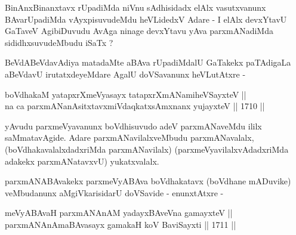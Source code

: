 \begin{artha}
BinAnxBinanxtavx rUpadiMda niVnu sAdhisidadx elAlx vasutxvanunx
BAvarUpadiMda vAyxpisuvudeMdu heVLidedxV Adare - I elAlx devxYtavU
GaTaveV AgibiDuvudu AvAga ninage  devxYtavu yAva parxmANadiMda
sididhxsuvudeMbudu iSaTx ?
\end{artha}

\begin{artha}
BeVdABeVdavAdiya matadaMte aBAva rUpadiMdalU GaTakekx paTAdigaLa
aBeVdavU irutatxdeyeMdare AgalU doVSavanunx heVLutAtxre - 
\end{artha}

\begin{shl}
\footnotemark[1]boVdhakaM yatapxrXmeVyasayx tatapxrXmANamiheVSayxteV || \\
na ca parxmANanAsitxtavxmiVdaqkatxsAmxnanx yujayxteV \hfill || 1710 ||  
\end{shl}

\begin{artha}
yAvudu parxmeVyavanunx boVdhisuvudo adeV parxmANaveMdu
ililx saMmatavAgide. Adare parxmANavilalxveMbudu parxmANavalalx,
(boVdhakavalalxdadxriMda parxmANavilalx) (parxmeVyavilalxvAdadxriMda
adakekx parxmANatavxvU) yukatxvalalx.
\end{artha}

\begin{artha}
parxmANABAvakekx parxmeVyABAva boVdhakatavx (boVdhane mADuvike)
veMbudanunx aMgiVkarisidarU doVSavide - enunxtAtxre -
\end{artha}

\begin{shl}
\footnotemark[1]meVyABAvaH parxmANAnAM yadayxBAveVna gamayxteV || \\
parxmANAnAmaBAvasayx gamakaH koV BaviSayxti \hfill || 1711 ||  
\end{shl}


